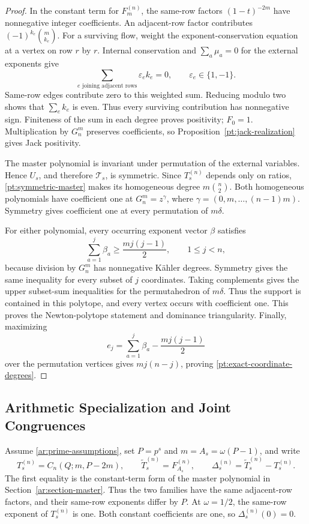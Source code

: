 \documentclass[11pt]{amsart}
\theoremstyle{definition}
\theoremstyle{remark}
\numberwithin{equation}{section}
\begin{document}
\begin{proof}
In the constant term for $F_m^{(n)}$, the same-row factors
$(1-t)^{-2m}$ have nonnegative integer coefficients. An
adjacent-row factor contributes $(-1)^{k_e}\binom m{k_e}$.
For a surviving flow, weight the exponent-conservation equation
at a vertex on row $r$ by $r$. Internal conservation and
$\sum_a\mu_a=0$ for the external exponents give
\[
 \sum_{e\text{ joining adjacent rows}}\varepsilon_e k_e=0,
 \qquad \varepsilon_e\in\{1,-1\}.
\]
Same-row edges contribute zero to this weighted sum.
Reducing modulo two shows that $\sum_e k_e$ is even. Thus
every surviving contribution has nonnegative sign. Finiteness
of the sum in each degree proves positivity; $F_0=1$.
Multiplication by $G_n^m$ preserves coefficients, so
Proposition~\ref{pt:jack-realization} gives Jack positivity.

The master polynomial is invariant under permutation of the
external variables. Hence $U_s$, and therefore $\mathcal T_s$,
is symmetric. Since $T_s^{(n)}$ depends only on ratios,
\eqref{pt:symmetric-master} makes its homogeneous degree
$m\binom n2$. Both homogeneous polynomials have coefficient
one at $G_n^m=z^\gamma$, where
$\gamma=(0,m,\ldots,(n-1)m)$. Symmetry gives coefficient one
at every permutation of $m\delta$.

For either polynomial, every occurring exponent vector $\beta$
satisfies
\[
 \sum_{a=1}^j\beta_a\geq\frac{mj(j-1)}2,
 \qquad 1\leq j<n,
\]
because division by $G_n^m$ has nonnegative K\"ahler degrees.
Symmetry gives the same inequality for every subset of $j$
coordinates. Taking complements gives the upper subset-sum
inequalities for the permutahedron of $m\delta$.
Thus the support is contained in this polytope, and every vertex
occurs with coefficient one. This proves the Newton-polytope
statement and dominance triangularity. Finally, maximizing
\[
 e_j=\sum_{a=1}^j\beta_a-\frac{mj(j-1)}2
\]
over the permutation vertices gives $m j(n-j)$, proving
\eqref{pt:exact-coordinate-degrees}.
\end{proof}


\subsection{Arithmetic Specialization and Joint Congruences}
Assume \eqref{ar:prime-assumptions}, set $P=p^s$ and
$m=A_s=\omega(P-1)$, and write
\begin{equation}\label{pt:two-families}
 T_s^{(n)}=C_n(Q;m,P-2m),\qquad
 \widetilde T_s^{(n)}=F_{A_s}^{(n)},\qquad
 \Delta_s^{(n)}=\widetilde T_s^{(n)}-T_s^{(n)}.
\end{equation}
The first equality is the constant-term form of the master
polynomial in Section~\ref{ar:section-master}. Thus the two
families have the same adjacent-row factors, and their same-row
exponents differ by $P$. At $\omega=1/2$, the same-row
exponent of $T_s^{(n)}$ is one. Both constant coefficients are
one, so $\Delta_s^{(n)}(0)=0$.
\end{document}
